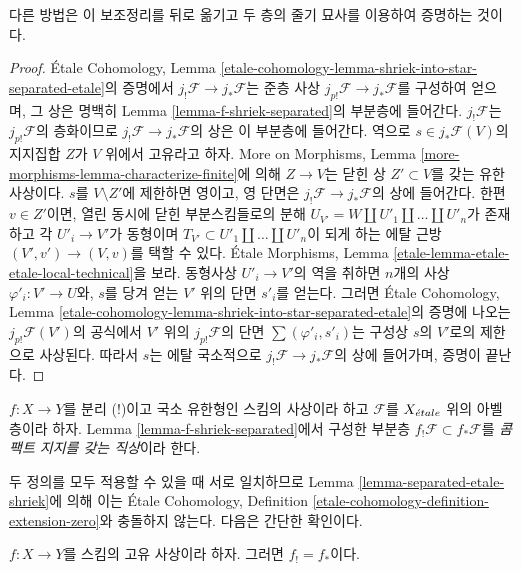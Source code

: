 \noindent
다른 방법은 이 보조정리를 뒤로 옮기고 두 층의 줄기 묘사를 이용하여
증명하는 것이다.

\begin{proof}
\'Etale Cohomology, Lemma
\ref{etale-cohomology-lemma-shriek-into-star-separated-etale}의 증명에서
$j_!\mathcal{F} \to j_*\mathcal{F}$는 준층 사상
$j_{p!}\mathcal{F} \to j_*\mathcal{F}$를 구성하여 얻으며, 그 상은
명백히 Lemma \ref{lemma-f-shriek-separated}의 부분층에 들어간다.
$j_!\mathcal{F}$는 $j_{p!}\mathcal{F}$의 층화이므로
$j_!\mathcal{F} \to j_*\mathcal{F}$의 상은 이 부분층에 들어간다.
역으로 $s \in j_*\mathcal{F}(V)$의 지지집합 $Z$가 $V$ 위에서
고유라고 하자. More on Morphisms, Lemma
\ref{more-morphisms-lemma-characterize-finite}에 의해 $Z \to V$는
닫힌 상 $Z' \subset V$를 갖는 유한 사상이다. $s$를
$V \setminus Z'$에 제한하면 영이고, 영 단면은
$j_!\mathcal{F} \to j_*\mathcal{F}$의 상에 들어간다.
한편 $v \in Z'$이면, 열린 동시에 닫힌 부분스킴들로의 분해
$U_{V'} = W \amalg U'_1 \amalg \ldots \amalg U'_n$가 존재하고
각 $U'_i \to V'$가 동형이며
$T_{V'} \subset U'_1 \amalg \ldots \amalg U'_n$이 되게 하는
에탈 근방 $(V',v') \to (V,v)$를 택할 수 있다. \'Etale Morphisms,
Lemma \ref{etale-lemma-etale-etale-local-technical}을 보라.
동형사상 $U'_i \to V'$의 역을 취하면 $n$개의 사상
$\varphi'_i : V' \to U$와, $s$를 당겨 얻는 $V'$ 위의 단면
$s'_i$를 얻는다. 그러면 \'Etale Cohomology, Lemma
\ref{etale-cohomology-lemma-shriek-into-star-separated-etale}의 증명에
나오는 $j_{p!}\mathcal{F}(V')$의 공식에서
$V'$ 위의 $j_{p!}\mathcal{F}$의 단면
$\sum (\varphi'_i,s'_i)$는 구성상 $s$의
$V'$로의 제한으로 사상된다. 따라서 $s$는 에탈 국소적으로
$j_!\mathcal{F} \to j_*\mathcal{F}$의 상에 들어가며, 증명이 끝난다.
\end{proof}

\begin{definition}
\label{definition-f-shriek-separated}
$f : X \to Y$를 분리 (!)이고 국소 유한형인 스킴의 사상이라 하고
$\mathcal{F}$를 $X_{\acute{e}tale}$ 위의 아벨 층이라 하자. Lemma
\ref{lemma-f-shriek-separated}에서 구성한 부분층
$f_!\mathcal{F} \subset f_*\mathcal{F}$를
{\it 콤팩트 지지를 갖는 직상}이라 한다.
\end{definition}

\noindent
두 정의를 모두 적용할 수 있을 때 서로 일치하므로 Lemma
\ref{lemma-separated-etale-shriek}에 의해 이는 \'Etale Cohomology,
Definition \ref{etale-cohomology-definition-extension-zero}와 충돌하지
않는다. 다음은 간단한 확인이다.

\begin{lemma}
\label{lemma-proper-f-shriek}
$f : X \to Y$를 스킴의 고유 사상이라 하자. 그러면 $f_! = f_*$이다.
\end{lemma}

